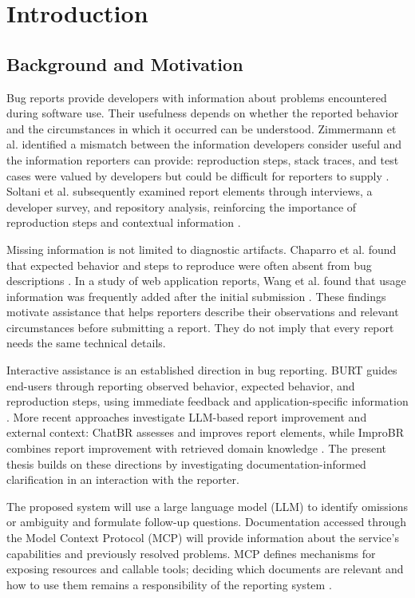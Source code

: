 \chapter{Introduction}
\label{chap:intro}

\section{Background and Motivation}
\label{sec:background}

Bug reports provide developers with information about problems encountered during software use. Their usefulness depends on whether the reported behavior and the circumstances in which it occurred can be understood. Zimmermann et al. identified a mismatch between the information developers consider useful and the information reporters can provide: reproduction steps, stack traces, and test cases were valued by developers but could be difficult for reporters to supply \cite{zimmermann2010}. Soltani et al. subsequently examined report elements through interviews, a developer survey, and repository analysis, reinforcing the importance of reproduction steps and contextual information \cite{soltani2020}.

Missing information is not limited to diagnostic artifacts. Chaparro et al. found that expected behavior and steps to reproduce were often absent from bug descriptions \cite{chaparro2017}. In a study of web application reports, Wang et al. found that usage information was frequently added after the initial submission \cite{wang2025}. These findings motivate assistance that helps reporters describe their observations and relevant circumstances before submitting a report. They do not imply that every report needs the same technical details.

Interactive assistance is an established direction in bug reporting. BURT guides end-users through reporting observed behavior, expected behavior, and reproduction steps, using immediate feedback and application-specific information \cite{song2022}. More recent approaches investigate LLM-based report improvement and external context: ChatBR assesses and improves report elements, while ImproBR combines report improvement with retrieved domain knowledge \cite{chatbr2024,akyol2026}. The present thesis builds on these directions by investigating documentation-informed clarification in an interaction with the reporter.

The proposed system will use a large language model (LLM) to identify omissions or ambiguity and formulate follow-up questions. Documentation accessed through the Model Context Protocol (MCP) will provide information about the service's capabilities and previously resolved problems. MCP defines mechanisms for exposing resources and callable tools; deciding which documents are relevant and how to use them remains a responsibility of the reporting system \cite{mcp2025resources,mcp2025tools}.

